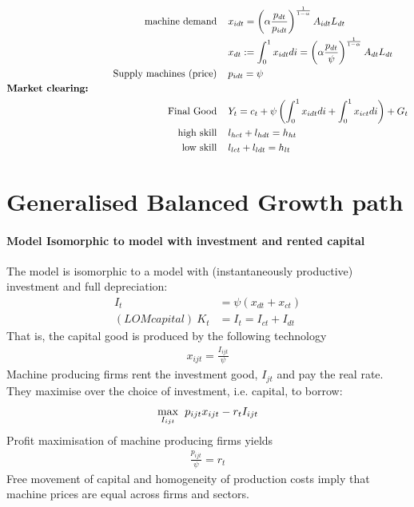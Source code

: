 \begin{align*}
\text{machine demand}\hspace{4mm} & x_{idt} = \left(\alpha\frac{ p_{dt}}{p_{idt}}\right)^\frac{1}{1-\alpha}A_{idt}L_{dt}\\
& x_{dt}:=\int_{0}^{1}x_{idt} di= \left(\alpha\frac{p_{dt}}{\psi}\right)^\frac{1}{1-\alpha}A_{dt}L_{dt}\\
\text{Supply machines (price)}\hspace{4mm}& p_{idt}=\psi\\
\text{\textbf{Market clearing:}}\hspace{50mm}& \nonumber\\
\text{Final Good}\hspace{4mm}& Y_{t}=c_t+\psi\left(\int_{0}^1x_{idt}di+\int_{0}^1x_{ict}di\right)+G_t%
\\
\text{high skill}\hspace{4mm}& l_{hct}+l_{hdt}=h_{ht}\\
\text{low skill}\hspace{4mm}&l_{lct}+l_{ldt}=h_{lt}
\end{align*}

\section{Generalised Balanced Growth path}

\paragraph{Model Isomorphic to model with investment and rented capital}
The model is isomorphic to a model with (instantaneously productive) investment and full depreciation: 
\begin{align*}
I_t&=\psi(x_{dt}+x_{ct})\\
(LOM capital) \ K_t&=I_t= I_{ct}+I_{dt}
\end{align*}
That is, the capital good is produced by the following technology
\begin{align*}
x_{ijt}=\frac{I_{ijt}}{\psi}
\end{align*}
Machine producing firms rent the investment good, $I_{jt}$ and pay the real rate. They maximise over the choice of investment, i.e. capital, to borrow:
\begin{align*}
\underset{I_{ijt}}{\max}\hspace{2mm}p_{ijt}x_{ijt}-r_tI_{ijt}
\end{align*}
Profit maximisation of machine producing firms yields
\begin{align*}
\frac{p_{ijt}}{\psi}=r_t
\end{align*}
Free movement of capital and homogeneity of production costs imply that machine prices are equal across firms and sectors. 


